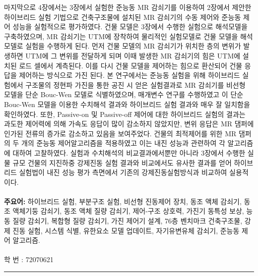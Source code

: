 마지막으로 4장에서는 3장에서 실험한 준능동 MR 감쇠기를 이용하여 2장에서 제안한 하이브리드 실험 기법으로 건축구조물에 설치된 MR 감쇠기의 수동 제어와 준능동 제어 성능을 실험적으로 평가하였다. 건물 모델은 3장에서 수행한 실험으로 해석모델을 구축하였으며, MR 감쇠기는 UTM에 장착하여 물리적인 실험모델로 건물 모델을 해석모델로 실험을 수행하게 된다. 먼저 건물 모델의 MR 감쇠기가 위치한 층의 변위가 발생하면 UTM에 그 변위를 전달하게 되며 이때 발생한 MR 감쇠기의 힘은 UTM에 설치된 로드 셀에서 계측된다. 이를 다시 건물 모델을 제어하는 힘으로 환산되어 건물 응답을 제어하는 방식으로 가진 된다. 본 연구에서는 준능동 실험을 위해 하이브리드 실험에서 구조물의 정현파 가진을 통한 공진 시 얻은 실험결과로 MR 감쇠기를 비선형 모델을 단순 Bouc-Wen 모델로 식별하였으며, 매개변수 연구를 수행하였고 이 단순 Bouc-Wen 모델을 이용한 수치해석 결과와 하이브리드 실험 결과와 매우 잘 일치함을 확인하였다. 또한, Passive-on 및 Passive-off 제어에 대한 하이브리드 실험의 결과는 과도한 제어력에 의해 가속도 응답이 많이 감소하지 않았지만, 변위 응답은 MR 댐퍼에 인가된 전류의 증가로 감소하고 있음을 보여주었다. 건물의 최적제어를 위한 MR 댐퍼의 두 개의 준능동 제어알고리즘을 적용하였고 이는 내진 성능과 관련하여 각 알고리즘에 대하여 고찰하였다. 실험과 수치해석의 비교결과에서뿐만 아니라 3장에서 수행한 실물 규모 건물의 지진하중 강제진동 실험 결과와 비교에서도 유사한 결과를 얻어 하이브리드 실험법이 내진 성능 평가 측면에서 기존의 강제진동실험방식과 비교하여 실용적이다.
\\
\\
{\large\textbf{주요어:}}
하이브리드 실험, 부분구조 실험, 비선형 진동제어 장치, 동조 액체 감쇠기, 동조 액체기둥 감쇠기, 동조 액체 질량 감쇠기, 제어-구조 상호력, 가진기 동특성 보상, 능동 질량 감쇠기, 복합형 질량 감쇠기, 가진 제어기 설계, 76층 벤치마크 건축구조물, 강제 진동 실험, 시스템 식별, 유한요소 모델 업데이트, 자기유변유체 감쇠기, 준능동 제어 알고리즘.
\\
\\
학 번 : 72070621\\
\noindent\rule[2pt]{\textwidth}{0.5pt}
